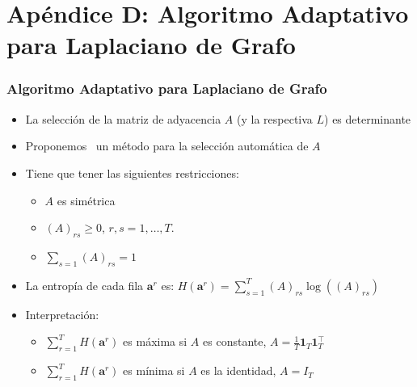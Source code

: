 \documentclass[aspectratio=43,spanish]{beamer}
\newcommand{\norm}[1]{\left\lVert#1\right\rVert}
\newcommand{\opt}[1]{{#1}^*}
\newcommand{\myvec}[1]{\bm{#1}}
\newcommand{\fv}[1]{\myvec{#1}}
\newcommand{\ntasks}{T}
\begin{document}
\section{Apéndice D: Algoritmo Adaptativo para Laplaciano de Grafo}
\begin{frame}
      \frametitle{Algoritmo Adaptativo para Laplaciano de Grafo}

      \begin{itemize}
            \item La selección de la matriz de adyacencia $A$ (y la respectiva $L$) es determinante
            \item Proponemos~ un método para la selección automática de $A$
            \item Tiene que tener las siguientes restricciones:
            \begin{itemize}
                  \item $A$ es simétrica
                  \item $(A)_{rs} \geq 0$, $r, s=1, \ldots, \ntasks$.
                  \item $\sum_{s=1} (A)_{rs} = 1$
              \end{itemize}
            \item La entropía de cada fila $\fv{a}^r$ es: $H(\fv{a}^r) = \sum_{s=1}^\ntasks (A)_{rs} \log((A)_{rs})$
            \item Interpretación:
            \begin{itemize}
                  \item $\sum_{r=1}^\ntasks H(\fv{a}^r) $ es máxima si $A$ es constante, $A = \frac{1}{\ntasks} \fv{1}_\ntasks \fv{1}_\ntasks^\intercal$
                  \item $\sum_{r=1}^\ntasks H(\fv{a}^r) $ es mínima si $A$ es la identidad, $A = I_\ntasks$ 
            \end{itemize}
            
      \end{itemize}

\end{frame}
\end{document}
